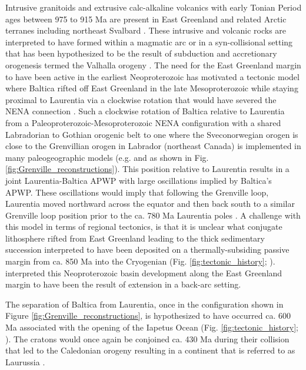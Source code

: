 \documentclass[twocolumn, switch]{article} %
\begin{document}
Intrusive granitoids and extrusive calc-alkaline volcanics with early Tonian Period ages between 975 to 915 Ma are present in East Greenland and related Arctic terranes including northeast Svalbard \citep{McClelland2019a}. These intrusive and volcanic rocks are interpreted to have formed within a magmatic arc or in a syn-collisional setting \citep{Johansson1999a} that has been hypothesized to be the result of subduction and accretionary orogenesis termed the Valhalla orogeny \citep{Cawood2010a}. The need for the East Greenland margin to have been active in the earliest Neoproterozoic has motivated a tectonic model where Baltica rifted off East Greenland in the late Mesoproterozoic while staying proximal to Laurentia via a clockwise rotation that would have severed the NENA connection \citep{Cawood2010a}. Such a clockwise rotation of Baltica relative to Laurentia from a Paleoproterozoic-Mesoproterozoic NENA configuration with a shared Labradorian to Gothian orogenic belt to one where the Sveconorwegian orogen is close to the Grenvillian orogen in Labrador (northeast Canada) is implemented in many paleogeographic models (e.g. \citealp{Evans2009a} and as shown in Fig. \ref{fig:Grenville_reconstructions}). This position relative to Laurentia results in a joint Laurentia-Baltica APWP with large oscillations implied by Baltica's APWP. These oscillations would imply that following the Grenville loop, Laurentia moved northward across the equator and then back south to a similar Grenville loop position prior to the ca. 780 Ma Laurentia poles \citep{Evans2015a,Fairchild2017a}.  A challenge with this model in terms of regional tectonics, is that it is unclear what conjugate lithosphere rifted from East Greenland leading to the thick sedimentary succession interpreted to have been deposited on a thermally-subsiding passive margin from ca. 850 Ma into the Cryogenian (Fig. \ref{fig:tectonic_history}; \citealp{Maloof2006a}). \cite{Malone2014a} interpreted this Neoproterozoic basin development along the East Greenland margin to have been the result of extension in a back-arc setting. 

The separation of Baltica from Laurentia, once in the configuration shown in Figure \ref{fig:Grenville_reconstructions}, is hypothesized to have occurred ca. 600 Ma associated with the opening of the Iapetus Ocean (Fig. \ref{fig:tectonic_history}; \citealp{Cawood2001a}). The cratons would once again be conjoined ca. 430 Ma during their collision that led to the Caledonian orogeny resulting in a continent that is referred to as Laurussia \citep{Torsvik2017a}.
\end{document}
